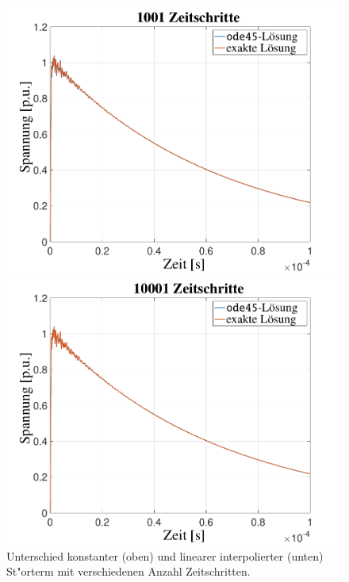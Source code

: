\begin{refsection}
\begin{figure}
\begin{minipage}{.32\textwidth}
	        \includegraphics[width=\linewidth]{./trafo/images/Interp1001.pdf}
	    \end{minipage}
	    \begin{minipage}{.32\textwidth}
	        \centering
	        \includegraphics[width=\linewidth]{./trafo/images/Interp10001.pdf}
	    \end{minipage}
	    \caption{Unterschied konstanter (oben) und linearer interpolierter (unten) St"orterm mit verschiedenen Anzahl Zeitschritten.}
	    \label{trafo:interpVergleich}
	\end{figure}


\end{refsection}
